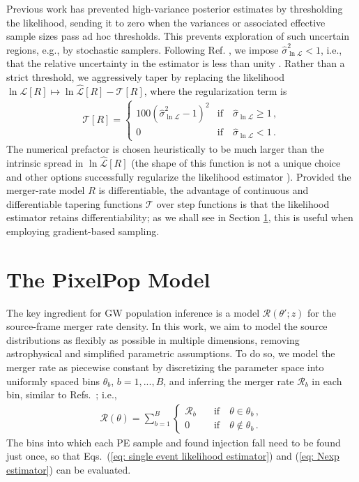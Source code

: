 \documentclass[%
reprint,
 amsmath,amssymb,
 aps,
 prd,nofootinbib,nobibnotes,
 superscriptaddress,groupedaddress,
]{revtex4-2}
\begin{document}
Previous work has prevented high-variance posterior estimates by thresholding the likelihood, sending it to zero when the variances \cite{Talbot:2023pex} or associated effective sample sizes \cite{Farr:2019rap, KAGRA:2021duu} pass ad hoc thresholds. This prevents exploration of such uncertain regions, e.g., by stochastic samplers. Following Ref. \cite{Talbot:2023pex}, we impose $\hat{\sigma}_{\ln\mathcal{L}}^2 < 1$, i.e., that the relative uncertainty in the estimator is less than unity \cite{Essick:2022ojx}. Rather than a strict threshold, we aggressively taper by replacing the likelihood $\ln\mathcal{L}[R] \mapsto \ln\hat{\mathcal{L}}[R] - \mathcal{T}[R]$, where the regularization term is
\begin{align}
\mathcal{T}[R]
=
\begin{cases}
100 ( \hat{\sigma}_{\ln\mathcal{L}}^2 - 1 )^2
& \mathrm{if} \quad \hat{\sigma}_{\ln\mathcal{L}} \geq 1
\, ,
\\
0
& \mathrm{if} \quad \hat{\sigma}_{\ln\mathcal{L}} < 1
\, .
\end{cases}
\label{eq: likelihood taper}
\end{align}
The numerical prefactor is chosen heuristically to be much larger than the intrinsic spread in $\ln\hat{\mathcal{L}}[R]$ (the shape of this function is not a unique choice and other options successfully regularize the likelihood estimator \cite{Callister:2023tgi}). Provided the merger-rate model $R$ is differentiable, the advantage of continuous and differentiable tapering functions $\mathcal{T}$ over step functions is that the likelihood estimator retains differentiability; as we shall see in Section \ref{sec: car model}, this is useful when employing gradient-based sampling.

\section{The PixelPop Model}
\label{sec: car model}

The key ingredient for GW population inference is a model $\mathcal{R}(\theta';z)$ for the source-frame merger rate density. In this work, we aim to model the source distributions as flexibly as possible in multiple dimensions, removing astrophysical and simplified parametric assumptions. To do so, we model the merger rate as piecewise constant by discretizing the parameter space into uniformly spaced bins $\theta_b$, $b=1,...,B$, and inferring the merger rate $\mathcal{R}_b$ in each bin, similar to Refs.~\cite{KAGRA:2021duu, Mandel:2016prl, Vitale:2018yhm, Ng:2020qpk, Ng:2022agi, Ray:2023upk, MaganaHernandez:2024uty, Ray:2024hos}; i.e.,
\begin{align}
\label{eq: binned rate}
\mathcal{R}(\theta)
=
\sum_{b=1}^B
\begin{cases}
\mathcal{R}_b \quad & \mathrm{if} \quad \theta \in \theta_b \, ,
\\
0 \quad & \mathrm{if} \quad \theta \notin \theta_b \, .
\end{cases}
\end{align}
The bins into which each PE sample and found injection fall need to be found just once, so that Eqs.~(\ref{eq: single event likelihood estimator}) and (\ref{eq: Nexp estimator}) can be evaluated.
\end{document}

